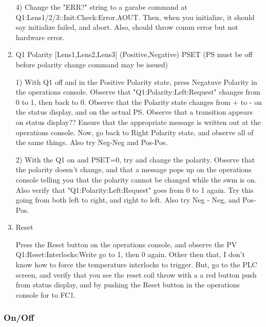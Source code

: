 \documentclass[11pt]{book}		%
\begin{document}
\begin{enumerate}
4) Change the "ERR?" string to a garabe command at Q1:Lens1/2/3::Init:Check:Error.AOUT. Then, when you initialize, it should say initialize failed, and abort. Also, should throw comm error but not hardware error.


\color{black}

 \item Q1 Polarity [Lens1,Lens2,Lens3] (Positive,Negative) PSET (PS must be off before polarity change command may be issued)

\color{red}

1) With Q1 off and in the Positive Polarity state, press Negatuve Polarity in the operations console. Observe that "Q1:Polarity:Left:Request" changes from 0 to 1, then back to 0. Observe that the Polarity state changes from + to - on the status display, and on the actual PS. Observe that a transition appears on status display?? Ensure that the appropriate message is written out at the operations console. Now, go back to Right Polarity state, and observe all of the same things. Also try Neg-Neg and Pos-Pos.

2) With the Q1 on and PSET=0, try and change the polarity. Observe that the polarity doesn't change, and that a message pops up on the operations console telling you that the polarity cannot be changed while the swm is on. Also verify that "Q1:Polarity:Left:Request" goes from 0 to 1 again. Try this going from both left to right, and right to left. Also try Neg - Neg, and Pos- Pos.


\color{black}

 \item Reset

\color{red}

Press the Reset button on the operations console, and observe the PV Q1:Reset:Interlocks:Write go to 1, then 0 again. Other then that, I don't know how to force the temperature interlocks to trigger. But, go to the PLC screen, and verify that you see the reset coil throw with a a red button push from status display, and by pushing the Reset button in the operations console for to FC1.

\color{black}

\end{enumerate}

\subsubsection{On/Off} \label{sect:cyc-equip-ctl-beamline-quad1-state-controls-on-off}
\end{document}
